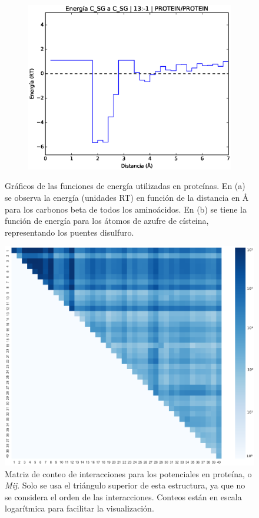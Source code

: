 \begin{figure}[p]
\begin{subfigure}{.8\textwidth}
\centering
\includegraphics[width=\textwidth]{figures/prot_pot/dd/sh2sh.eps}
\caption{}
\end{subfigure}
\caption[Ejemplos de funciones de energía en proteínas]{Gráficos de las funciones de energía utilizadas en proteínas. 
En (a) se observa la energía (unidades RT) en función de la distancia en \si{\angstrom} para los carbonos beta de todos los aminoácidos. 
En (b) se tiene la función de energía para los átomos de azufre de císteina, representando los puentes disulfuro.}
\label{fig:energy1}
\end{figure}

\begin{figure}[p]
\includegraphics[width=\textwidth]{figures/prot_pot/mij.png}
\caption[Matriz de conteo para el cálculo del factor $\sigma$]{Matriz de conteo de interacciones para los potenciales en proteína, o \textit{Mij}. 
Solo se usa el triángulo superior de esta estructura, ya que no se considera el orden de las interacciones. 
Conteos están en escala logarítmica para facilitar la visualización.}
\label{fig:mij}
\end{figure}
\cleardoublepage

